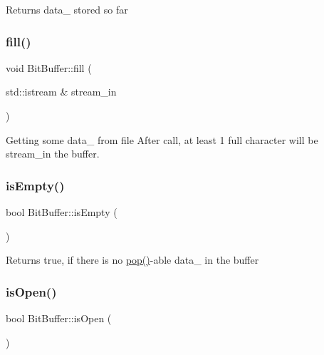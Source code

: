 \begin{DoxyReturn}{Returns}
data\+\_\+ stored so far 
\end{DoxyReturn}
\mbox{\label{class_bit_buffer_a91b2bfeb34d3e2d01fd23f417928f261}} 
\subsubsection{\texorpdfstring{fill()}{fill()}}
{\footnotesize\ttfamily void Bit\+Buffer\+::fill (\begin{DoxyParamCaption}\item[{std\+::istream \&}]{stream\+\_\+in }\end{DoxyParamCaption})}

Getting some data\+\_\+ from file After call, at least 1 full character will be stream\+\_\+in the buffer. \mbox{\label{class_bit_buffer_aaec114c48d1b1be84a8178b6b956f3d0}} 
\subsubsection{\texorpdfstring{is\+Empty()}{isEmpty()}}
{\footnotesize\ttfamily bool Bit\+Buffer\+::is\+Empty (\begin{DoxyParamCaption}{ }\end{DoxyParamCaption})\hspace{0.3cm}{\ttfamily [inline]}}

\begin{DoxyReturn}{Returns}
true, if there is no \hyperlink{class_bit_buffer_a8f569dfa9535ac107c84846f22a45221}{pop()}-\/able data\+\_\+ in the buffer 
\end{DoxyReturn}
\mbox{\label{class_bit_buffer_ae70825daafd0a00625fbb6dfb9b83fba}} 
\subsubsection{\texorpdfstring{is\+Open()}{isOpen()}}
{\footnotesize\ttfamily bool Bit\+Buffer\+::is\+Open (\begin{DoxyParamCaption}{ }\end{DoxyParamCaption})\hspace{0.3cm}{\ttfamily [inline]}}

